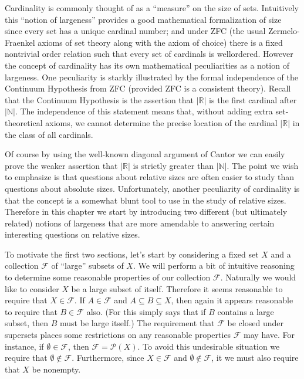 \documentclass[12pt]{article}
\theoremstyle{plain}
\theoremstyle{definition}
\newcommand{\bbN}{\mathbb{N}}
\newcommand{\bbR}{\mathbb{R}}
\newcommand{\calF}{\mathcal{F}}
\newcommand{\calP}{\mathcal{P}}
\begin{document}
Cardinality is commonly thought of as a ``measure'' on the size of sets.
Intuitively this ``notion of largeness'' provides a good mathematical formalization of size since every set has a unique cardinal number; and under ZFC (the usual Zermelo-Fraenkel axioms of set theory along with the axiom of choice) there is a fixed nontrivial order relation such that every set of cardinals is wellordered.
However the concept of cardinality has its own mathematical peculiarities as a notion of largeness.
One peculiarity is starkly illustrated by the formal independence of the Continuum Hypothesis from ZFC (provided ZFC is a consistent theory).
Recall that the Continuum Hypothesis is the assertion that $|\bbR|$ is the first cardinal after $|\bbN|$.
The independence of this statement means that, without adding extra set-theoretical axioms, we cannot determine the precise location of the cardinal $|\bbR|$ in the class of all cardinals.

Of course by using the well-known diagonal argument of Cantor%
we can easily prove the weaker assertion that $|\bbR|$ is strictly greater than $|\bbN|$.
The point we wish to emphasize is that questions about relative sizes are often easier to study than questions about absolute sizes.
Unfortunately, another peculiarity of cardinality is that the concept is a somewhat blunt tool to use in the study of relative sizes.
Therefore in this chapter we start by introducing two different (but ultimately related) notions of largeness that are more amendable to answering certain interesting questions on relative sizes.

To motivate the first two sections, let's start by considering a fixed set $X$ and a collection $\calF$ of ``large'' subsets of $X$. 
We will perform a bit of intuitive reasoning to determine some reasonable properties of our collection $\calF$.
Naturally we would like to consider $X$ be a large subset of itself.
Therefore it seems reasonable to require that $X \in \calF$.
If $A \in \calF$ and $A \subseteq B \subseteq X$, then again it appears reasonable to require that $B \in \calF$ also.
(For this simply says that if $B$ contains a large subset, then $B$ must be large itself.)
The requirement that $\calF$ be closed under supersets places some restrictions on any reasonable properties $\calF$ may have.
For instance, if $\emptyset \in \calF$, then $\calF = \calP(X)$. 
To avoid this undesirable situation we require that $\emptyset \not\in \calF$.
Furthermore, since $X \in \calF$ and $\emptyset \not\in \calF$, it we must also require that $X$ be nonempty.
\end{document}
